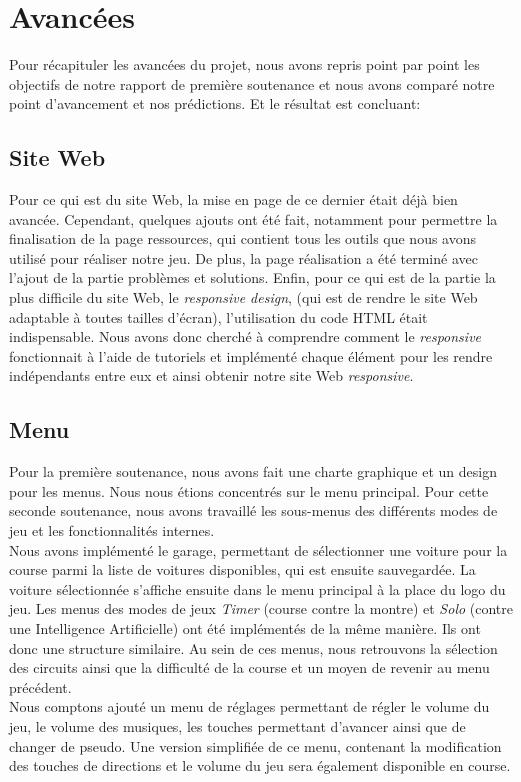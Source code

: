 \documentclass[12pt,a4paper]{article}
\newcommand{\AI}{Intelligence Artificielle}
\begin{document}
    \section{Avancées}
        Pour récapituler les avancées du projet, nous avons repris point par point les objectifs de 
        notre rapport de première soutenance et nous avons comparé notre point d'avancement et nos prédictions.
        Et le résultat est concluant:
        
        \subsection{Site Web}
            Pour ce qui est du site Web, la mise en page de ce dernier était déjà bien avancée. 
            Cependant, quelques ajouts ont été fait, notamment pour permettre la finalisation de la 
            page ressources, qui contient tous les outils que nous avons utilisé pour réaliser notre 
            jeu. De plus, la page réalisation a été terminé avec l'ajout de la partie 
            problèmes et solutions.
            Enfin, pour ce qui est de la partie la plus difficile du site Web, le \textsl{responsive 
            design}, (qui est de rendre le site Web adaptable à toutes tailles d'écran), l'utilisation 
            du code HTML était indispensable. Nous avons donc cherché à comprendre comment le 
            \textsl{responsive} fonctionnait à l'aide de tutoriels et implémenté chaque élément 
            pour les rendre indépendants entre eux et ainsi obtenir notre site Web \textsl{responsive}.
        
        \subsection{Menu}
            Pour la première soutenance, nous avons fait une charte graphique et un design pour les 
            menus.
            Nous nous étions concentrés sur le menu principal. Pour cette seconde soutenance, nous 
            avons travaillé les
            sous-menus des différents modes de jeu et les fonctionnalités internes.\\
            Nous avons implémenté le garage, permettant de
            sélectionner une voiture pour la course parmi la liste de voitures disponibles, qui
            est ensuite sauvegardée. La voiture sélectionnée s'affiche ensuite dans le menu principal
            à la place du logo du jeu. Les menus des modes de
            jeux \textsl{Timer} (course contre la montre) et \textsl{Solo} (contre une \AI) ont
            été implémentés de la même manière. Ils ont donc une structure similaire. Au sein de
            ces menus, nous retrouvons la sélection des circuits ainsi que la difficulté de la course et
            un moyen de revenir au menu précédent.\\
            Nous comptons ajouté un menu de réglages permettant de régler le volume du jeu, le volume
            des musiques, les touches permettant d'avancer ainsi que de changer de pseudo. Une 
            version simplifiée de ce menu, contenant la modification des touches de directions et le
            volume du jeu sera également disponible en course.
\end{document}
